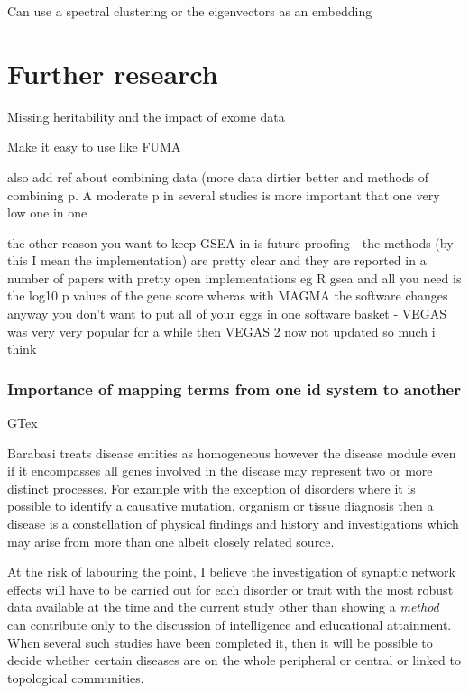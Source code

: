 Can use a spectral clustering or the eigenvectors as an embedding
\section{Further research}
Missing heritability and the impact of exome data

Make it easy to use like FUMA


 also add ref about combining data (more data dirtier better  and methods of combining p. A moderate p in several studies is more important that one very low one in one
 
 the other reason you want to keep GSEA in is future proofing - the methods (by this I mean the implementation) are pretty clear and they are reported in a number of papers with pretty open implementations eg R gsea and all you need is the log10 p values of the gene score wheras with MAGMA the software changes anyway you don't want to put all of your eggs in one software basket - VEGAS was very very popular for a while then VEGAS 2 now not updated so much i think
  \subsubsection{Importance of mapping terms from one id system to another}
 GTex
 
 
 
 Barabasi treats disease entities as homogeneous however the disease module even if it encompasses all genes involved in the disease may represent two or more distinct processes. For example with the exception of disorders where it is possible to identify a causative mutation, organism or tissue diagnosis then a disease is a constellation of physical findings and history and investigations which may arise from more than one albeit closely related source.
 
 
  At the risk of labouring the point, I believe the investigation of synaptic network effects will have to be carried out for each disorder or trait with the most robust data available at the time and the current study other than showing a \textit{method} can contribute only to the discussion of intelligence and educational attainment. When several such studies have been completed it, then it will be possible to decide whether certain diseases are on the whole peripheral or central or linked to topological communities.
  
